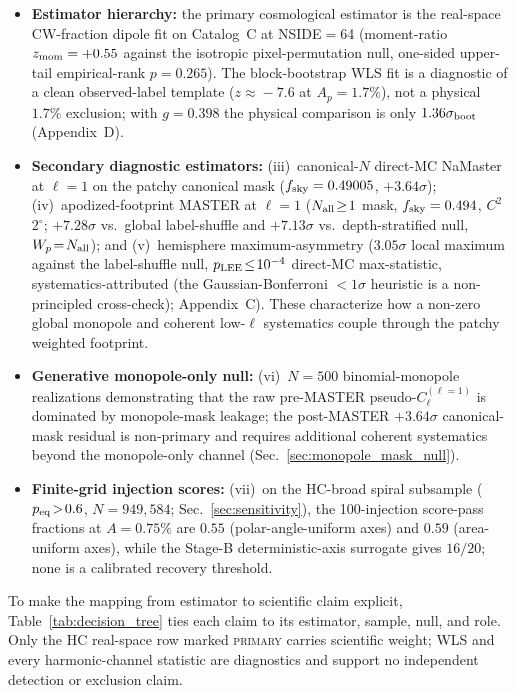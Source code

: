 \documentclass[aps,prd,twocolumn,superscriptaddress,preprintnumbers,nofootinbib,longbibliography,floatfix]{revtex4-2}
\newcommand{\sigmaunit}{\sigma}
\begin{document}
\begin{itemize}\setlength{\itemsep}{0pt}
\item \textbf{Estimator hierarchy:} the primary cosmological estimator is the real-space CW-fraction dipole fit on Catalog~C at NSIDE$=$64 (moment-ratio $z_{\rm mom}=+0.55$ against the isotropic pixel-permutation null, one-sided upper-tail empirical-rank $p=0.265$). The block-bootstrap WLS fit is a diagnostic of a clean observed-label template ($z\!\approx\!-7.6$ at $A_p=1.7\%$), not a physical $1.7\%$ exclusion; with $g=0.398$ the physical comparison is only $1.36\sigma_{\rm boot}$ (Appendix~D).
\item \textbf{Secondary diagnostic estimators:} (iii)~canonical-$N$ direct-MC NaMaster at $\ell=1$ on the patchy canonical mask ($f_{\rm sky}=0.49005$, $+3.64\sigmaunit$); (iv)~apodized-footprint MASTER at $\ell=1$ ($N_{\rm all}\!\geq\!1$ mask, $f_{\rm sky}=0.494$, $C^2$ $2^\circ$; $+7.28\sigmaunit$ vs.\ global label-shuffle and $+7.13\sigmaunit$ vs.\ depth-stratified null, $W_p\!=\!N_{\rm all}$); and (v)~hemisphere maximum-asymmetry ($3.05\sigmaunit$ local maximum against the label-shuffle null, $p_{\rm LEE}\!\le\!10^{-4}$ direct-MC max-statistic, systematics-attributed (the Gaussian-Bonferroni $<\!1\sigmaunit$ heuristic is a non-principled cross-check); Appendix~C). These characterize how a non-zero global monopole and coherent low-$\ell$ systematics couple through the patchy weighted footprint.
\item \textbf{Generative monopole-only null:} (vi)~$N=500$ binomial-monopole realizations demonstrating that the raw pre-MASTER pseudo-$C_\ell^{(\ell=1)}$ is dominated by monopole-mask leakage; the post-MASTER $+3.64\sigmaunit$ canonical-mask residual is non-primary and requires additional coherent systematics beyond the monopole-only channel (Sec.~\ref{sec:monopole_mask_null}).
\item \textbf{Finite-grid injection scores:} (vii)~on the HC-broad spiral subsample ($p_{\rm eq}\!>\!0.6$, $N\!=\!949{,}584$; Sec.~\ref{sec:sensitivity}), the 100-injection score-pass fractions at $A\!=\!0.75\%$ are $0.55$ (polar-angle-uniform axes) and $0.59$ (area-uniform axes), while the Stage-B deterministic-axis surrogate gives $16/20$; none is a calibrated recovery threshold.
\end{itemize}

To make the mapping from estimator to scientific claim explicit, Table~\ref{tab:decision_tree} ties each claim to its estimator, sample, null, and role. Only the HC real-space row marked \textsc{primary} carries scientific weight; WLS and every harmonic-channel statistic are diagnostics and support no independent detection or exclusion claim.
\end{document}
